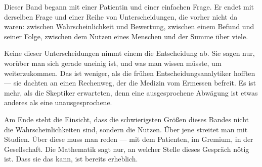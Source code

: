 \begin{merksatz}
\begin{center}
\begin{minipage}{0.9\textwidth}
Dieser Band begann mit einer Patientin und einer einfachen Frage. Er endet mit derselben Frage und einer Reihe von Unterscheidungen, die vorher nicht da waren: zwischen Wahrscheinlichkeit und Bewertung, zwischen einem Befund und seiner Folge, zwischen dem Nutzen eines Menschen und der Summe über viele.

Keine dieser Unterscheidungen nimmt einem die Entscheidung ab. Sie sagen nur, worüber man sich gerade uneinig ist, und was man wissen müsste, um weiterzukommen. Das ist weniger, als die frühen Entscheidungsanalytiker hofften --- sie dachten an einen Rechenweg, der die Medizin vom Ermessen befreit. Es ist mehr, als die Skeptiker erwarteten, denn eine ausgesprochene Abwägung ist etwas anderes als eine unausgesprochene.

Am Ende steht die Einsicht, dass die schwierigsten Größen dieses Bandes nicht die Wahrscheinlichkeiten sind, sondern die Nutzen. Über jene streitet man mit Studien. Über diese muss man reden --- mit dem Patienten, im Gremium, in der Gesellschaft. Die Mathematik sagt nur, an welcher Stelle dieses Gespräch nötig ist. Dass sie das kann, ist bereits erheblich.
\end{minipage}
\end{center}

\begin{center}
\begin{minipage}{0.88\textwidth}
\end{minipage}
\end{center}
\end{merksatz}
